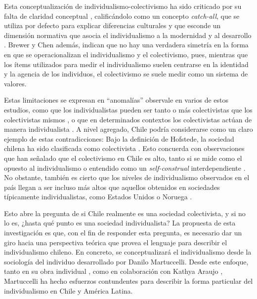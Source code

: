 \documentclass[12pt,twoside]{templates/facsothesis}
\begin{document}
Esta conceptualización de individualismo-colectivismo ha sido criticado por su falta de claridad conceptual \citep{oyserman2002}, calificándolo como un concepto \emph{catch-all}, que se utiliza por defecto para explicar diferencias culturales \citep{voronov2002} y que esconde un dimensión normativa que asocia el individualismo a la modernidad y al desarrollo \citep{voronov2002, wang2010, martuccelli2010, moemeka1998}. Brewer y Chen \citeyearpar{brewer2007} además, indican que no hay una verdadera simetría en la forma en que se operacionalizan el individualismo y el colectivismo, pues, mientras que los ítems utilizados para medir el individualismo suelen centrarse en la identidad y la agencia de los individuos, el colectivismo se suele medir como un sistema de valores.

Estas limitaciones se expresan en ``anomalías'' observale en varios de estos estudios, como que los individualistas pueden ser tanto o más colectivistas que los colectivistas mismos \citep{oyserman2002}, o que en determinados contextos los colectivistas actúan de manera individualista \citep{voronov2002}. A nivel agregado, Chile podría considerarse como un claro ejemplo de estas contradicciones: Bajo la definición de Hofstede, la sociedad chilena ha sido clasificada como colectivista \citep{rojas2008}. Esto concuerda con observaciones que han señalado que el colectivismo en Chile es alto, tanto si se mide como el opuesto al individualismo \citep{oyserman2002} o entendido como un \emph{self-construal} interdependiente \citep{benavides2020}. No obstante, también es cierto que los niveles de individualismo observados en el país llegan a ser incluso más altos que aquellos obtenidos en sociedades típicamente individualistas, como Estados Unidos \citep{oyserman2002} o Noruega \citep{kolstad2009}.

Esto abre la pregunta de si Chile realmente es una sociedad colectivista, y si no lo es, ¿hasta qué punto es una sociedad individualista? La propuesta de esta investigación es que, con el fin de responder esta pregunta, es necesario dar un giro hacia una perspectiva teórica que provea el lenguaje para describir el individualismo chileno. En concreto, se conceptualizará el individualismo desde la sociología del individuo desarrollado por Danilo Martuccelli. Desde este enfoque, tanto en su obra individual \citep{martuccelli2010, martuccelli2018}, como en colaboración con Kathya Araujo \citep{araujo2014, araujo2020, araujo2012}, Martuccelli ha hecho esfuerzos contundentes para describir la forma particular del individualismo en Chile y América Latina.
\end{document}
